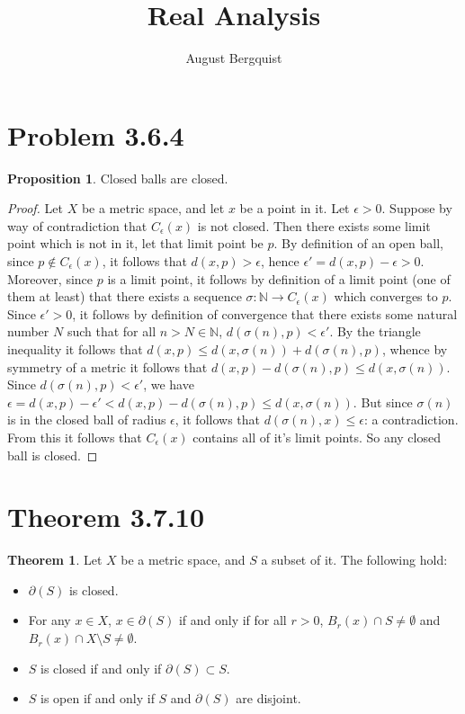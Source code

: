 \documentclass[11pt]{article}
\title{Real Analysis}
\author{August Bergquist}
\newcommand{\N}{\mathbb{N}}
\theoremstyle{definition}
\newtheorem{theorem}{Theorem}
\newtheorem{proposition}{Proposition}
\begin{document}
\maketitle


\section{Problem 3.6.4}

\begin{proposition}
Closed balls are closed.
\end{proposition}
\begin{proof}
Let $X$ be a metric space, and let $x$ be a point in it. Let $\epsilon > 0$. Suppose by way of contradiction that $C_\epsilon(x)$ is not closed. Then there exists some limit point which is not in it, let that limit point be $p$. By definition of an open ball, since $p\not \in C_\epsilon(x)$, it follows that $d(x,p) > \epsilon$, hence $ \epsilon'= d(x,p) - \epsilon > 0 $. Moreover, since $p$ is a limit point, it follows by definition of a limit point (one of them at least) that there exists a sequence $\sigma : \N \to C_\epsilon(x)$ which converges to $p$. Since $\epsilon'> 0$, it follows by definition of convergence that there exists some natural number $N$ such that for all $n>N\in \N$, $d(\sigma(n), p) < \epsilon'$. By the triangle inequality it follows that $d(x,p) \le d(x,\sigma(n)) + d(\sigma(n), p)$, whence by symmetry of a metric it follows that $d(x,p) - d(\sigma(n), p) \le d(x,\sigma(n))$. Since $d(\sigma(n), p) < \epsilon'$, we have $\epsilon = d(x,p) - \epsilon' < d(x,p)- d(\sigma(n), p) \le d(x,\sigma(n)).$ But since $\sigma(n)$ is in the closed ball of radius $\epsilon$, it follows that $d(\sigma(n), x) \le \epsilon$: a contradiction. From this it follows that $C_\epsilon(x)$ contains all of it's limit points. So any closed ball is closed.
\end{proof}

\section{Theorem 3.7.10}

\begin{theorem}
Let $X$ be a metric space, and $S$ a subset of it. The following hold:
\begin{itemize}
\item $\partial(S)$ is closed.
\item For any $x\in X$, $x\in \partial(S)$ if and only if for all $r > 0$, $B_r(x) \cap S \ne \emptyset$ and $B_r(x) \cap X\setminus S \ne \emptyset$. 
\item $S$ is closed if and only if $\partial(S) \subset S$.
\item $S$ is open if and only if $S$ and $\partial(S)$ are disjoint.
\end{itemize}

\end{theorem}
\end{document}
